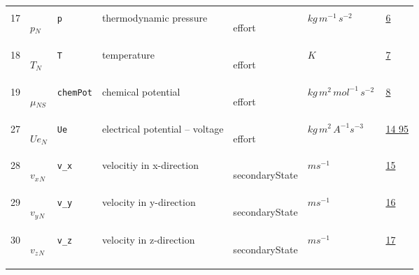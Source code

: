 \begin{longtable}{|p{1cm}|p{2.5cm}|p{4.5cm}|p{8cm}|p{3.0cm}|p{3cm}|p{1cm}|}
             & \\
    17
             & \hypertarget{"v:17"}{ $ {p}{_{N}} $}
             & \verb|p|
             & thermodynamic pressure
             & \begin{lay}effort \end{lay}
             & $ kg \,m^{-1} \,s^{-2} \, $
             & \hyperlink{"e:6"}{ 6 }
                 \\
    18
             & \hypertarget{"v:18"}{ $ {T}{_{N}} $}
             & \verb|T|
             & temperature
             & \begin{lay}effort \end{lay}
             & $ K \, $
             & \hyperlink{"e:7"}{ 7 }
                 \\
    19
             & \hypertarget{"v:19"}{ $ {\mu}{_{{N S}}} $}
             & \verb|chemPot|
             & chemical potential
             & \begin{lay}effort \end{lay}
             & $ kg \,m^{2} \,mol^{-1} \,s^{-2} \, $
             & \hyperlink{"e:8"}{ 8 }
                 \\
    27
             & \hypertarget{"v:27"}{ $ {Ue}{_{N}} $}
             & \verb|Ue|
             & electrical potential -- voltage
             & \begin{lay}effort \end{lay}
             & $ kg \,m^{2} \,A^{-1} s^{-3} \, $
             & \hyperlink{"e:14"}{ 14 }
                 \hyperlink{"e:95"}{ 95 }
                 \\
    28
             & \hypertarget{"v:28"}{ $ {{v_x}}{_{N}} $}
             & \verb|v_x|
             & velocitiy in x-direction
             & \begin{lay}secondaryState \end{lay}
             & $ m s^{-1} \, $
             & \hyperlink{"e:15"}{ 15 }
                 \\
    29
             & \hypertarget{"v:29"}{ $ {{v_y}}{_{N}} $}
             & \verb|v_y|
             & velocity in y-direction
             & \begin{lay}secondaryState \end{lay}
             & $ m s^{-1} \, $
             & \hyperlink{"e:16"}{ 16 }
                 \\
    30
             & \hypertarget{"v:30"}{ $ {{v_z}}{_{N}} $}
             & \verb|v_z|
             & velocity in z-direction
             & \begin{lay}secondaryState \end{lay}
             & $ m s^{-1} \, $
             & \hyperlink{"e:17"}{ 17 }
                 \\
    \end{longtable}